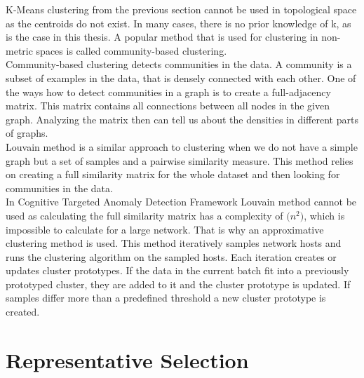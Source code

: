 \documentclass[thesis=B,english]{FITthesis}[2012/10/20]
\begin{document}

K-Means clustering from the previous section cannot be used in topological space as the centroids do not exist.
In many cases, there is no prior knowledge of k, as is the case in this thesis.
A popular method that is used for clustering in non-metric spaces is called community-based clustering. \\

Community-based clustering detects communities in the data.
A community is a subset of examples in the data, that is densely connected with each other.
One of the ways how to detect communities in a graph is to create a full-adjacency matrix.
This matrix contains all connections between all nodes in the given graph.
Analyzing the matrix then can tell us about the densities in different parts of graphs.\\

Louvain method is a similar approach to clustering when we do not have a simple graph but a set of samples and a pairwise similarity measure.
This method relies on creating a full similarity matrix for the whole dataset and then looking for communities in the data. \\

In Cognitive Targeted Anomaly Detection Framework Louvain method cannot be used as calculating the full similarity matrix has a complexity of $\mathcal(n^2)$, which is impossible to calculate for a large network.
That is why an approximative clustering method is used.
This method iteratively samples network hosts and runs the clustering algorithm on the sampled hosts.
Each iteration creates or updates cluster prototypes.
If the data in the current batch fit into a previously prototyped cluster, they are added to it and the cluster prototype is updated.
If samples differ more than a predefined threshold a new cluster prototype is created.



\chapter{Representative Selection}
\end{document}
